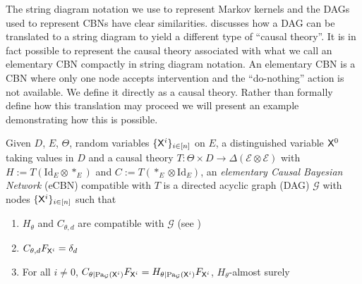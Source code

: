The string diagram notation we use to represent Markov kernels and the DAGs used to represent CBNs have clear similarities. \citet{fong_causal_2013} discusses how a DAG can be translated to a string diagram to yield a different type of ``causal theory''. It is in fact possible to represent the causal theory associated with what we call an elementary CBN compactly in string diagram notation. An elementary CBN is a CBN where only one node accepts intervention and the ``do-nothing'' action is not available. We define it directly as a causal theory. Rather than formally define how this translation may proceed we will present an example demonstrating how this is possible.

\begin{definition}\label{def:CBN}

Given $D$, $E$, $\Theta$, random variables $\{\mathsf{X}^i\}_{i\in [n]}$ on $E$, a distinguished variable $\mathsf{X}^0$ taking values in $D$ and a causal theory $T:\Theta\times D\to \Delta(\mathcal{E}\otimes\mathcal{E})$ with $H:= T(\mathrm{Id}_E\otimes *_E)$ and $C:= T(*_E\otimes \mathrm{Id}_E)$, an \emph{elementary Causal Bayesian Network} (eCBN) compatible with $T$ is a directed acyclic graph (DAG) $\mathcal{G}$ with nodes $\{\mathsf{X}^i\}_{i\in [n]}$ such that

\begin{enumerate}
    \item $H_\theta$ and $C_{\theta,d}$ are compatible with $\mathcal{G}$ (see \citet{pearl_causality:_2009})
    \item $C_{\theta,d} F_{\mathsf{X}^i}=\delta_{d}$
    \item For all $i\neq 0$, $C_{\theta|\text{Pa}_{\mathcal{G}}(\mathsf{X}^i)} F_{\mathsf{X}^i}=H_{\theta|\text{Pa}_{\mathcal{G}}(\mathsf{X}^i)}F_{\mathsf{X}^i} $, $H_\theta$-almost surely
\end{enumerate}
\end{definition}

